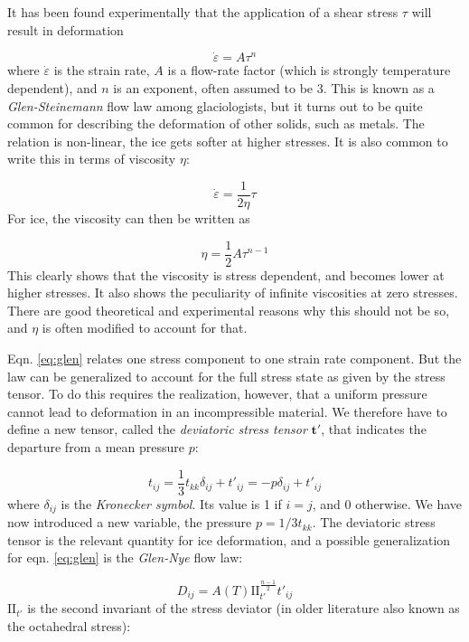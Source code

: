 \documentclass[12pt, openany]{memoir}
\newcommand{\eps}{\dot{\varepsilon}}
\begin{document}
It has been found experimentally that the application of a shear
stress $\tau$ will result in deformation

\begin{equation} \label{eq:glen}
\eps = A\tau^n
\end{equation}
where $\eps$ is the strain rate, $A$ is a flow-rate factor (which is
strongly temperature dependent), and $n$ is an exponent, often assumed
to be 3. This is known as a \emph{Glen-Steinemann} flow law among
glaciologists, but it turns out to be quite common for describing the
deformation of other solids, such as metals. The relation is non-linear, the ice gets
softer at higher stresses. It is also common to write this in terms of
viscosity $\eta$:

\begin{equation}
\eps = \frac{1}{2\eta}\tau
\end{equation}
For ice, the viscosity can then be written as

\begin{equation}
\eta = \frac{1}{2} A \tau^{n-1}
\end{equation}
This clearly shows that the viscosity is stress dependent, and becomes
lower at higher stresses. It also shows the peculiarity of infinite
viscosities at zero stresses. There are good theoretical and
experimental reasons why this should not be so, and $\eta$ is often
modified to account for that.

Eqn. \ref{eq:glen} relates one stress component to one strain rate
component. But the law can be generalized to account for the full
stress state as given by the stress tensor. To do this requires the
realization, however, that a uniform pressure cannot lead to
deformation in an incompressible material. We therefore have to define
a new tensor, called the \emph{deviatoric stress tensor}
$\mathbf{t}'$, that indicates the departure from a mean pressure $p$:

\begin{equation}
t_{ij} = \frac{1}{3} t_{kk}\delta_{ij} + t'_{ij} = -p \delta_{ij} +
t'_{ij}
\end{equation}
where $\delta_{ij}$ is the \emph{Kronecker symbol}. Its value is 1 if
$i=j$, and 0 otherwise. We have now introduced a new variable, the
pressure $p = 1/3 t_{kk}$. The deviatoric stress tensor is the
relevant quantity for ice deformation, and a possible generalization
for eqn. \ref{eq:glen} is the \emph{Glen-Nye} flow law:

\begin{equation} \label{eq:glennye}
D_{ij} = A(T) \mathrm{II}_{t'}^\frac{n-1}{2} t'_{ij}
\end{equation}
$\mathrm{II}_{t'}$ is the second invariant of the stress deviator (in
older literature also known as the octahedral stress):
\end{document}
